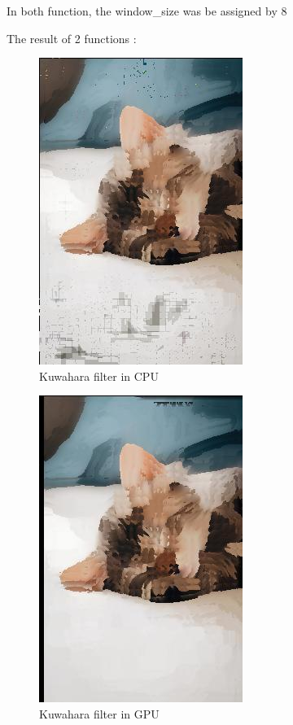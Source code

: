 \documentclass{article}
\begin{document}
    In both function, the window\_size was be assigned by 8

    The result of 2 functions :

    \begin{figure}
        \centering
        \includegraphics{cute-cat-kuwahara_cpu.jpg}
        \caption{Kuwahara filter in CPU}
        \label{fig:figure2}
    \end{figure}

    \begin{figure}
        \centering
        \includegraphics{cute-cat-kuwahara_gpu.jpg}
        \caption{Kuwahara filter in GPU}
        \label{fig:figure3}
    \end{figure}
\end{document}
